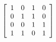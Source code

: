 \documentclass[letterpaper, 12pt]{article}
\begin{document}
\begin{enumerate}
\begin{center}
\begin{varwidth}{\textwidth}
\begin{tasks}[label=(\alph*), label-width=1.5em, item-indent=2em, ref=(\alph*),label-offset=0em]
\begin{align*}
            &\left[
            \begin{array}{c c c c}
             	1 & 0 & 1 & 0\\
             	0 & 1 & 1 & 0\\
             	0 & 0 & 1 & 1\\
             	1 & 1 & 0 & 1
        	\end{array}
            \right]&
        \end{align*}
    \end{tasks}
    \end{varwidth}
    \end{center}
\end{enumerate}
\end{document}

